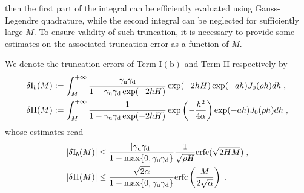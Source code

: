 then the first part of the integral can be efficiently evaluated  using  Gauss-Legendre quadrature, while the second integral can be neglected for sufficiently large $M$. To ensure   validity of such truncation, it is necessary to provide some  estimates on the associated truncation error as a function of $M$.
%
\begin{prop}
We denote the     truncation errors of Term $\mathrm{I(b)}$ and Term $\mathrm{II}$ respectively by
\begin{align*}
  \delta \mathrm{I}_b(M)&:=\int_M^{+\infty} \frac{\gamma_{\mathrm{u}}\gamma_{\mathrm{d}}}{1-\gamma_{\mathrm{u}}\gamma_{\mathrm{d}}\exp(-2hH)}  \exp(-2hH)\exp(-ah)  J_0(\rho h)d h \;,\\  
  \delta \mathrm{II}(M)&:=\int_M^{+\infty}  \frac{1}{1-\gamma_{\mathrm{u}}\gamma_{\mathrm{d}}\exp(-2hH)}\exp\left(-\frac{h^2}{4\alpha}\right)  \exp(-ah)  J_0(\rho h)d h \;,
\end{align*}
whose estimates read
\begin{align}
    \left\lvert\delta \mathrm{I}_b(M)\right\rvert &\leq  \frac{\left\lvert\gamma_{\mathrm{u}}\gamma_{\mathrm{d}}\right\rvert}{1-\max\{0,\gamma_{\mathrm{u}}\gamma_{\mathrm{d}}\}}\frac{1}{\sqrt{\rho H}}\mathrm{erfc}(\sqrt{2HM})\;,\\
    \left\lvert\delta \mathrm{II}(M)\right\rvert &\leq \frac{\sqrt{2\alpha} }{1-\max\{0,\gamma_{\mathrm{u}}\gamma_{\mathrm{d}}\}} \mathrm{erfc}\left(\frac{M}{2\sqrt{\alpha}}\right)\;.
\end{align}
\end{prop}
